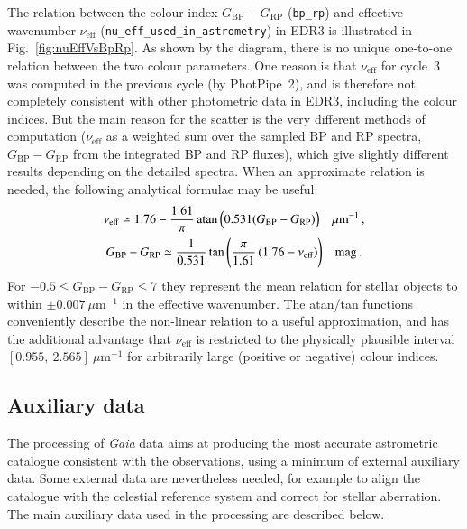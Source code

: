 \documentclass[longauth]{aa} %
\newcommand{\gacs}[1]{{\footnotesize\texttt{#1}}}
\begin{document}
The relation between the colour index  $G_\text{BP}-G_\text{RP}$ (\gacs{bp\_rp})
and effective wavenumber $\nu_\text{eff}$ (\gacs{nu\_eff\_used\_in\_astrometry}) in EDR3
is illustrated in Fig.~\ref{fig:nuEffVsBpRp}. As shown by the diagram, there is no unique 
one-to-one relation between the two colour parameters. One reason is that $\nu_\text{eff}$ 
for cycle~3 was computed in the previous cycle (by PhotPipe~2), and is therefore not 
completely consistent with other photometric data in EDR3, including the colour indices. 
But the main reason for the scatter is the very different methods of computation 
($\nu_\text{eff}$ as a weighted sum over the sampled BP and RP spectra, 
$G_\text{BP}-G_\text{RP}$ from the integrated BP and RP fluxes), which give slightly 
different results depending on the detailed spectra. When an approximate relation
is needed, the following analytical formulae may be useful:
\begin{gather}\label{eq:nuEff1}
\nu_\text{eff} \simeq 1.76 - \frac{1.61}{\pi}\,\text{atan}\,
\Bigl(0.531(G_\text{BP}-G_\text{RP})\Bigr)\quad \mu\text{m}^{-1}\, , \\
G_\text{BP}-G_\text{RP} \simeq \frac{1}{0.531}\,\text{tan}\,
\Biggl(\frac{\pi}{1.61}\,(1.76-\nu_\text{eff})\Biggr)\quad \text{mag} \, . \label{eq:nuEff2}
\end{gather}
For $-0.5\le G_\text{BP}-G_\text{RP}\le 7$ they represent the mean relation for stellar
objects to within $\pm 0.007~\mu$m$^{-1}$ in the effective wavenumber. 
The atan/tan functions conveniently describe the non-linear relation to a useful approximation,
and has the additional advantage that $\nu_\text{eff}$ is restricted to the physically plausible
interval $[0.955,~2.565]~\mu$m$^{-1}$ for arbitrarily large (positive or negative) colour 
indices. 


\subsection{Auxiliary data}
\label{sec:aux}

The processing of \textit{Gaia} data aims at producing the most accurate astrometric catalogue 
consistent with the observations, using a minimum of external auxiliary data. Some external data 
are nevertheless needed, for example to align the catalogue with the celestial reference system 
and correct for stellar aberration. The main auxiliary data used in the processing are described below. 
\end{document}
